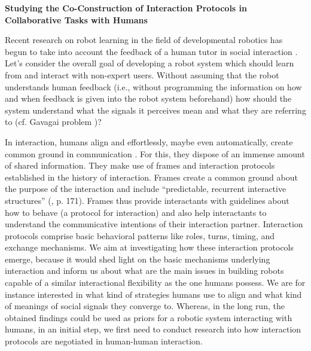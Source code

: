 \textbf{Studying the Co-Construction of Interaction Protocols in Collaborative Tasks with Humans}

Recent research on robot learning in the field of developmental robotics has begun to take into account the feedback of a human tutor in social interaction \cite{breazeal2004tutelage}. Let's consider the overall goal of developing a robot system which should learn from and interact with non-expert users. Without assuming that the robot understands human feedback (i.e., without programming the information on how and when feedback is given into the robot system beforehand) how should the system understand what the signals it perceives mean and what they are referring to (cf. Gavagai problem \cite{quine1964word})?

In interaction, humans align and effortlessly, maybe even automatically, create common ground in communication \cite{clark1991grounding,pickering2004toward}. For this, they dispose of an immense amount of shared information. They make use of frames and interaction protocols established in the history of interaction. Frames create a common ground about the purpose of the interaction \cite{tomasello2009cultural,rohlfing2013learning} and include ``predictable, recurrent interactive structures'' (\cite{ninio1996pragmatic}, p. 171). Frames thus provide interactants with guidelines about how to behave (a protocol for interaction) and also help interactants to understand the communicative intentions of their interaction partner. Interaction protocols comprise basic behavioral patterns like roles, turns, timing, and exchange mechanisms.
We aim at investigating how these interaction protocols emerge, because it would shed light on the basic mechanisms underlying interaction and inform us about what are the main issues in building robots capable of a similar interactional flexibility as the one humans possess. We are for instance interested in what kind of strategies humans use to align and what kind of meanings of social signals they converge to. Whereas, in the long run, the obtained findings could be used as priors for a robotic system interacting with humans, in an initial step, we first need to conduct research into how interaction protocols are negotiated in human-human interaction.


